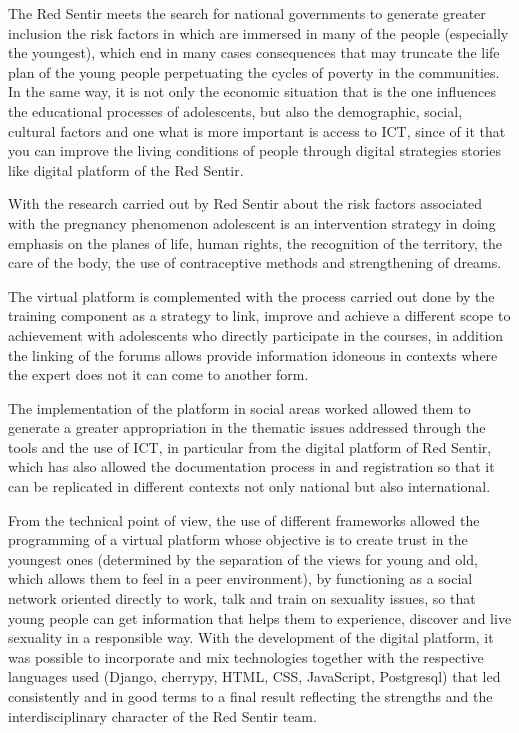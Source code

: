 \documentclass[journal,transmag]{IEEEtran}
\begin{document}
The Red Sentir meets the search for national governments to generate greater inclusion the risk factors in which are immersed in many of the people (especially the youngest), which end in many cases consequences that may truncate the life plan of the young people perpetuating the cycles of poverty in the communities. In the same way, it is not only the economic situation that is the one influences the educational processes of adolescents, but also the demographic, social, cultural factors and one what is more important is access to ICT, since of it that you can improve the living conditions of people through digital strategies stories like digital platform of the Red Sentir.

With the research carried out by Red Sentir about the risk factors associated with the pregnancy phenomenon adolescent is an intervention strategy in doing emphasis on the planes of life, human rights, the recognition of the territory, the care of the body, the use of contraceptive methods and strengthening of dreams.

The virtual platform is complemented with the process carried out done by the training component as a strategy to link, improve and achieve a different scope to achievement with adolescents who directly participate in the courses, in addition the linking of the forums allows provide information idoneous in contexts where the expert does not it can come to another form.

The implementation of the platform in social areas worked allowed them to generate a greater appropriation in the thematic issues addressed through the tools and the use of ICT, in particular from the digital platform of Red Sentir, which has also allowed the documentation process in and registration so that it can be replicated in different contexts not only national but also international.

From the technical point of view, the use of different frameworks allowed the programming of a virtual platform whose objective is to create trust in the youngest ones (determined by the separation of the views for young and old, which allows them to feel in a peer environment), by functioning as a social network oriented directly to work, talk and train on sexuality issues, so that young people can get information that helps them to experience, discover and live sexuality in a responsible way. With the development of the digital platform, it was possible to incorporate and mix technologies together with the respective languages used (Django, cherrypy, HTML, CSS, JavaScript, Postgresql) that led consistently and in good terms to a final result reflecting the strengths and the interdisciplinary character of the Red Sentir team.
\end{document}

